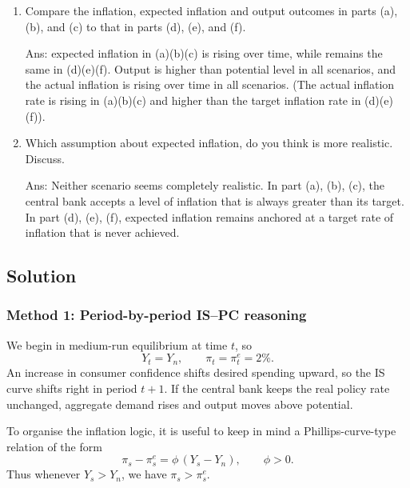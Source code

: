 \documentclass[12pt]{article}
\begin{document}
\begin{enumerate}[label=(\alph*),start=7]
    \item Compare the inflation, expected inflation and output outcomes in parts (a), (b), and (c) to that in parts (d), (e), and (f).

    Ans: expected inflation in (a)(b)(c) is rising over time, while remains the same in (d)(e)(f). Output is higher than potential level in all scenarios, and the actual inflation is rising over time in all scenarios. (The actual inflation rate is rising in (a)(b)(c) and higher than the target inflation rate in (d)(e)(f)).

    \item Which assumption about expected inflation, do you think is more realistic. Discuss.

    Ans: Neither scenario seems completely realistic. In part (a), (b), (c), the central bank accepts a level of inflation that is always greater than its target. In part (d), (e), (f), expected inflation remains anchored at a target rate of inflation that is never achieved.
\end{enumerate}

\newpage
\subsection{Solution}

\subsubsection{Method 1: Period-by-period IS--PC reasoning}
We begin in medium-run equilibrium at time \(t\), so
\[
Y_t=Y_n,
\qquad
\pi_t=\pi_t^e=2\%.
\]
An increase in consumer confidence shifts desired spending upward, so the IS curve shifts right in period \(t+1\). If the central bank keeps the real policy rate unchanged, aggregate demand rises and output moves above potential.

To organise the inflation logic, it is useful to keep in mind a Phillips-curve-type relation of the form
\[
\pi_s-\pi_s^e = \phi\,(Y_s-Y_n),
\qquad \phi>0.
\]
Thus whenever \(Y_s>Y_n\), we have \(\pi_s>\pi_s^e\).
\end{document}
